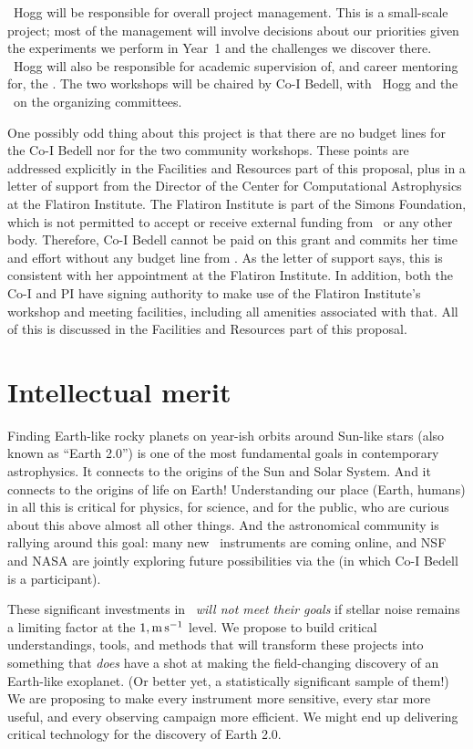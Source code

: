 \documentclass[12pt, letterpaper]{article}
\begin{document}
\PI\ Hogg will be responsible for overall project management. This is a
small-scale project; most of the management will involve decisions about our
priorities given the experiments we perform in Year~1 and the
challenges we discover there.
\PI\ Hogg will also be responsible for academic supervision of, and
career mentoring for, the \GRA.
The two workshops will be chaired by Co-I Bedell, with \PI\ Hogg and
the \GRA\ on the organizing committees.

One possibly odd thing about this project is that there are no budget lines for
the Co-I Bedell nor for the two community workshops.
These points are addressed explicitly in the Facilities and Resources part of this
proposal, plus in a letter of support from the Director of the Center for Computational
Astrophysics at the Flatiron Institute.
The Flatiron Institute is part of the Simons Foundation, which is not permitted to
accept or receive external funding from \NSF\ or any other body.
Therefore, Co-I Bedell cannot be paid on this grant and commits her time and
effort without any budget line from \NSF.
As the letter of support says, this is consistent with her appointment at the Flatiron
Institute.
In addition, both the Co-I and PI have signing authority to make use of
the Flatiron Institute's workshop and meeting facilities, including all amenities
associated with that.
All of this is discussed in the Facilities and Resources part of this proposal.

\section{Intellectual merit}

Finding Earth-like rocky planets on year-ish orbits
around Sun-like stars (also known as ``Earth 2.0'') is one of the most fundamental goals
in contemporary astrophysics.
It connects to the origins of the Sun and Solar System.
And it connects to the origins of life on Earth!
Understanding our place (Earth, humans) in all this is critical for physics, for science, and for the
public, who are curious about this above almost all other things.
And the astronomical community is rallying around this goal: many new \EPRV\ instruments 
are coming online, and NSF and NASA are jointly exploring future possibilities via the 
 (in which Co-I Bedell is a participant).

These significant investments in \EPRV\ \textit{will not meet their goals} if
stellar noise remains a limiting factor at the $1,{\mathrm{m\,s^{-1}}}$ level. 
We propose to build critical understandings, tools, and methods that will transform
these projects into something that \textit{does} have a shot at making the field-changing 
discovery of an Earth-like exoplanet. (Or better yet, a statistically significant sample of them!) 
We are proposing to make every instrument more sensitive, every star more useful,
and every observing campaign more efficient.
We might end up delivering critical technology for the discovery of Earth 2.0.
\end{document}
